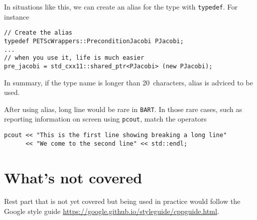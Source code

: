 \documentclass{article}
\newcommand{\bart}{{\tt BART}}
\begin{document}
In situations like this, we can create an alias for the type with {\tt typedef}. For instance
\begin{lstlisting}
// Create the alias
typedef PETScWrappers::PreconditionJacobi PJacobi;
...
// when you use it, life is much easier
pre_jacobi = std_cxx11::shared_ptr<PJacobi> (new PJacobi);
\end{lstlisting}

In summary, if the type name is longer than 20\ characters, alias is adviced to be used.

After using alias, long line would be rare in \bart. In those rare cases, such as reporting information on screen using {\tt pcout}, match the operators
\begin{lstlisting}
pcout << "This is the first line showing breaking a long line"
      << "We come to the second line" << std::endl;
\end{lstlisting}
\section{What's not covered}
Rest part that is not yet covered but being used in practice would follow the Google style guide \url{https://google.github.io/styleguide/cppguide.html}.

\end{document}
